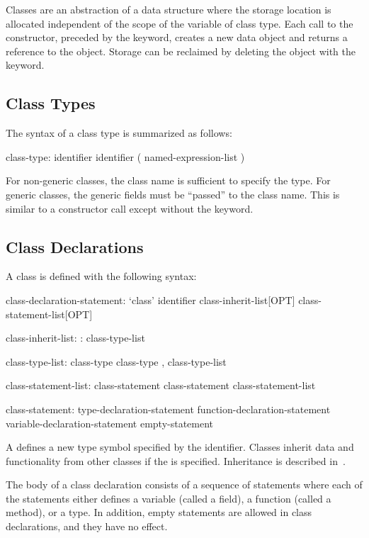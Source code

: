 \label{Classes}

Classes are an abstraction of a data structure where the storage location is
allocated independent of the scope of the variable of class type.  Each call to
the constructor, preceded by the  keyword, creates a new data object
and returns a reference to the object.  Storage can be reclaimed by deleting the object with the  keyword.

\subsection{Class Types}
\label{Class_Types}

The syntax of a class type is summarized as follows:
\begin{syntax}
class-type:
  identifier
  identifier ( named-expression-list )
\end{syntax}
For non-generic classes, the class name is sufficient to specify the
type.  For generic classes, the generic fields must be ``passed'' to
the class name.  This is similar to a constructor call except without
the  keyword.

\subsection{Class Declarations}
\label{Class_Declarations}

A class is defined with the following syntax:
\begin{syntax}
class-declaration-statement:
  `class' identifier class-inherit-list[OPT] {
    class-statement-list[OPT] }

class-inherit-list:
  : class-type-list

class-type-list:
  class-type
  class-type , class-type-list

class-statement-list:
  class-statement
  class-statement class-statement-list

class-statement:
  type-declaration-statement
  function-declaration-statement
  variable-declaration-statement
  empty-statement
\end{syntax}
A  defines a new type symbol
specified by the identifier.  Classes inherit data and functionality
from other classes if the  is specified.
Inheritance is described in~.

The body of a class declaration consists of a sequence of statements
where each of the statements either defines a variable (called a
field), a function (called a method), or a type.  In addition, empty
statements are allowed in class declarations, and they have no effect.


